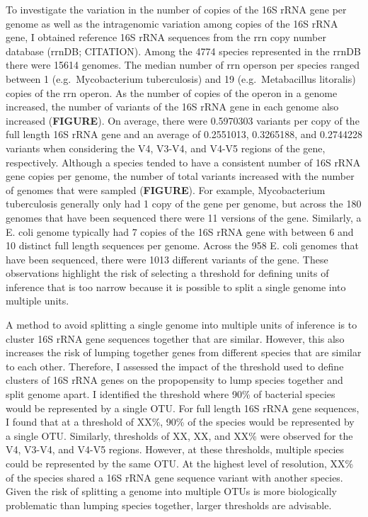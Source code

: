 \documentclass[
]{article}
\begin{document}
To investigate the variation in the number of copies of the 16S rRNA
gene per genome as well as the intragenomic variation among copies of
the 16S rRNA gene, I obtained reference 16S rRNA sequences from the rrn
copy number database (rrnDB; CITATION). Among the 4774 species
represented in the rrnDB there were 15614 genomes. The median number of
rrn operson per species ranged between 1 (e.g.~Mycobacterium
tuberculosis) and 19 (e.g.~Metabacillus litoralis) copies of the rrn
operon. As the number of copies of the operon in a genome increased, the
number of variants of the 16S rRNA gene in each genome also increased
(\textbf{FIGURE}). On average, there were 0.5970303 variants per copy of
the full length 16S rRNA gene and an average of 0.2551013, 0.3265188,
and 0.2744228 variants when considering the V4, V3-V4, and V4-V5 regions
of the gene, respectively. Although a species tended to have a
consistent number of 16S rRNA gene copies per genome, the number of
total variants increased with the number of genomes that were sampled
(\textbf{FIGURE}). For example, Mycobacterium tuberculosis generally
only had 1 copy of the gene per genome, but across the 180 genomes that
have been sequenced there were 11 versions of the gene. Similarly, a E.
coli genome typically had 7 copies of the 16S rRNA gene with between 6
and 10 distinct full length sequences per genome. Across the 958 E. coli
genomes that have been sequenced, there were 1013 different variants of
the gene. These observations highlight the risk of selecting a threshold
for defining units of inference that is too narrow because it is
possible to split a single genome into multiple units.

A method to avoid splitting a single genome into multiple units of
inference is to cluster 16S rRNA gene sequences together that are
similar. However, this also increases the risk of lumping together genes
from different species that are similar to each other. Therefore, I
assessed the impact of the threshold used to define clusters of 16S rRNA
genes on the propopensity to lump species together and split genome
apart. I identified the threshold where 90\% of bacterial species would
be represented by a single OTU. For full length 16S rRNA gene sequences,
I found that at a threshold of XX\%, 90\% of the species would be
represented by a single OTU. Similarly, thresholds of XX, XX, and XX\%
were observed for the V4, V3-V4, and V4-V5 regions. However, at these
thresholds, multiple species could be represented by the same OTU. At
the highest level of resolution, XX\% of the species shared a 16S rRNA
gene sequence variant with another species. Given the risk of splitting
a genome into multiple OTUs is more biologically problematic than
lumping species together, larger thresholds are advisable.
\end{document}
